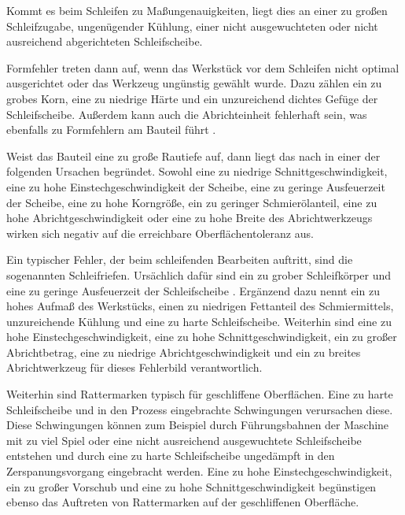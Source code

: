 Kommt es beim Schleifen zu Maßungenauigkeiten, liegt dies an einer zu großen Schleifzugabe, ungenügender Kühlung, einer nicht ausgewuchteten oder nicht ausreichend abgerichteten Schleifscheibe. 

Formfehler treten dann auf, wenn das Werkstück vor dem Schleifen nicht optimal ausgerichtet oder das Werkzeug ungünstig gewählt wurde. Dazu zählen ein zu grobes Korn, eine zu niedrige Härte und ein unzureichend dichtes Gefüge der Schleifscheibe. Außerdem kann auch die Abrichteinheit fehlerhaft sein, was ebenfalls zu Formfehlern am Bauteil führt \cite{Winkler.1990}. 

Weist das Bauteil eine zu große Rautiefe auf, dann liegt das nach \cite{Winkler.1990} in einer der folgenden Ursachen begründet. Sowohl eine zu niedrige Schnittgeschwindigkeit, eine zu hohe Einstechgeschwindigkeit der Scheibe, eine zu geringe Ausfeuerzeit der Scheibe, eine zu hohe Korngröße, ein zu geringer Schmierölanteil, eine zu hohe Abrichtgeschwindigkeit oder eine zu hohe Breite des Abrichtwerkzeugs wirken sich negativ auf die erreichbare Oberflächentoleranz aus. 

Ein typischer Fehler, der beim schleifenden Bearbeiten auftritt, sind die sogenannten Schleifriefen. Ursächlich dafür sind ein zu grober Schleifkörper und eine zu geringe Ausfeuerzeit der Schleifscheibe \cite{Dietrich.2014}.      
Ergänzend dazu nennt \cite{Winkler.1990} ein zu hohes Aufmaß des Werkstücks, einen zu niedrigen Fettanteil des Schmiermittels, unzureichende Kühlung und eine zu harte Schleifscheibe. Weiterhin sind eine zu hohe Einstechgeschwindigkeit, eine zu hohe Schnittgeschwindigkeit, ein zu großer Abrichtbetrag, eine zu niedrige Abrichtgeschwindigkeit und ein zu breites Abrichtwerkzeug für dieses Fehlerbild verantwortlich.

Weiterhin sind Rattermarken typisch für geschliffene Oberflächen. Eine zu harte Schleifscheibe und in den Prozess eingebrachte Schwingungen verursachen diese. Diese Schwingungen können zum Beispiel durch Führungsbahnen der Maschine mit zu viel Spiel oder eine nicht ausreichend ausgewuchtete Schleifscheibe entstehen und durch eine zu harte Schleifscheibe ungedämpft in den Zerspanungsvorgang eingebracht werden. Eine zu hohe Einstechgeschwindigkeit, ein zu großer Vorschub und eine zu hohe Schnittgeschwindigkeit begünstigen ebenso das Auftreten von Rattermarken auf der geschliffenen Oberfläche.     





 

      





 

   
     



      







